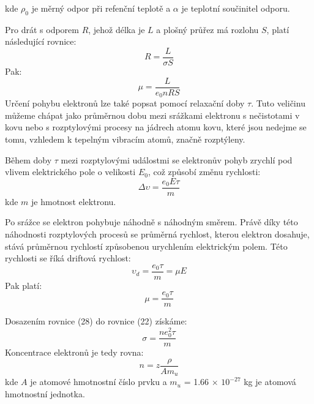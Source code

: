 \documentclass[a4paper,11pt]{article}
\begin{document}
    \begin{minipage}[t]{0.5\textwidth} 
        kde $\rho_0$ je měrný odpor při refenční teplotě a $\alpha$ je teplotní součinitel odporu. 
        \par Pro drát s odporem $R$, jehož délka je $L$ a plošný průřez má rozlohu $S$, platí následující rovnice:
        \begin{equation}
            R = \frac{L}{\sigma S}
        \end{equation}
        Pak: 
        \begin{equation}
            \mu = \frac{L}{e_0 n R S}
        \end{equation}
        Určení pohybu elektronů lze také popsat pomocí relaxační doby $\tau$. Tuto veličinu můžeme chápat jako průměrnou dobu mezi srážkami elektronu s nečistotami v kovu nebo s rozptylovými procesy na jádrech atomu kovu, které jsou nedejme se tomu, vzhledem k tepelným vibracím atomů, značně rozptýleny. 
        \par Během doby $\tau$ mezi rozptylovými událostmi se elektronův pohyb zrychlí pod vlivem elektrického pole o velikosti $E_0$, což způsobí změnu rychlosti:
        \begin{equation}
            \Delta \upsilon = \frac{e_0 E \tau}{m}
        \end{equation}
        kde $m$ je hmotnost elektronu. 
        \par Po srážce se elektron pohybuje náhodně s náhodným směrem. Právě díky této náhodnosti rozptylových procesů se průměrná rychlost, kterou elektron dosahuje, stává průměrnou rychlostí způsobenou urychlením elektrickým polem. Této rychlosti se říká driftová rychlost:
        \begin{equation}
            \upsilon_d = \frac{e_0 \tau}{m} = \mu E
        \end{equation}
        Pak platí:
        \begin{equation}
            \mu = \frac{e_0 \tau}{m}
        \end{equation}
        \par Dosazením rovnice (28) do rovnice (22) získáme: 
        \begin{equation}
            \sigma = \frac{n e_0^2 \tau}{m}
        \end{equation}
        Koncentrace elektronů je tedy rovna: 
        \begin{equation}
            n = z \frac{\rho}{Am_u}
        \end{equation}
        kde $A$ je atomové hmotnostní číslo prvku a $m_u$ = 1.66 $\times$ $10^{-27}$ kg je atomová hmotnostní jednotka.

\end{minipage}
\end{document}
